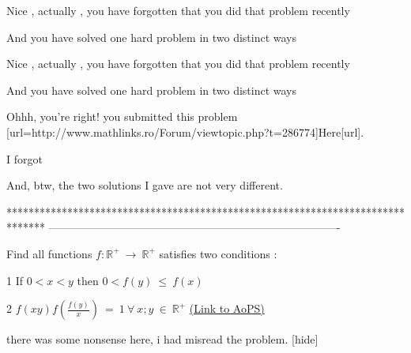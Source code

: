 \begin{solution}
	\begin{italicized}Nice , actually , you have forgotten that you did that problem recently 

 And you have solved one hard problem in two distinct ways \end{italicized} 
\end{solution}



\begin{solution}
	\begin{tcolorbox}\begin{italicized}Nice , actually , you have forgotten that you did that problem recently 

 And you have solved one hard problem in two distinct ways \end{italicized} \end{tcolorbox}

Ohhh, you're right! you submitted this problem [url=http://www.mathlinks.ro/Forum/viewtopic.php?t=286774]Here[\/url].

I forgot   

And, btw, the two solutions I gave are not very different.
\end{solution}
*******************************************************************************
-------------------------------------------------------------------------------

\begin{problem}
	Find all functions $ f : \mathbb{R^{+}} \ \to \ \mathbb{R^{+}}$ satisfies two conditions :

1 \/ If $ 0 < x < y$ then $ 0< f(y) \ \leq \ f(x)$

 2 \/ $ f(xy) f \left( \frac{f(y)}{x} \right) \ = \ 1 \ \forall \ x;y \ \in \ \mathbb{R^{+}}$
	\flushright \href{https://artofproblemsolving.com/community/c6h298438}{(Link to AoPS)}
\end{problem}



\begin{solution} there was some nonsense here, i had misread the problem. [\/hide]
\end{solution}



